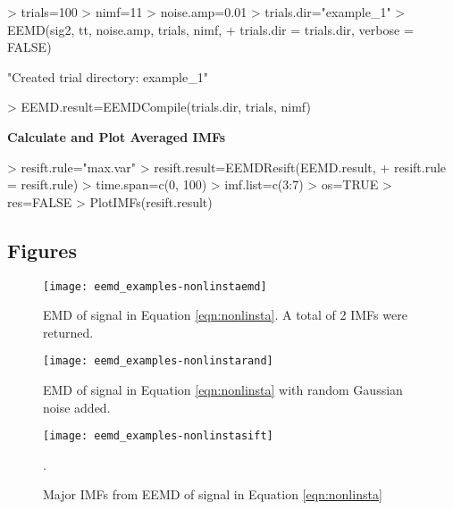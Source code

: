 \documentclass[12pt]{article}
\begin{document}
\begin{Schunk}
\begin{Sinput}
> trials=100
> nimf=11
> noise.amp=0.01
> trials.dir="example_1"
> EEMD(sig2, tt, noise.amp, trials, nimf, 
+     trials.dir = trials.dir, verbose = FALSE)
\end{Sinput}
\begin{Soutput}
[1] "Created trial directory: example_1"
\end{Soutput}
\begin{Sinput}
> EEMD.result=EEMDCompile(trials.dir, trials, nimf)
\end{Sinput}
\end{Schunk}

\textbf{Calculate and Plot Averaged IMFs}

\begin{Schunk}
\begin{Sinput}
> resift.rule="max.var"
> resift.result=EEMDResift(EEMD.result, 
+ resift.rule = resift.rule)
> time.span=c(0, 100)
> imf.list=c(3:7)
> os=TRUE
> res=FALSE
> PlotIMFs(resift.result)
\end{Sinput}
\end{Schunk}

\subsection{Figures}

\FloatBarrier

\begin{figure}[ht]
\begin{center}
\texttt{[image: eemd\_examples-nonlinstaemd]}
\end{center}
\caption{EMD of signal in Equation \ref{eqn:nonlinsta}.
A total of 2 IMFs were returned.}
\label{fig:nonlinstaemd}
\end{figure}

\begin{figure}[ht]
\begin{center}
\texttt{[image: eemd\_examples-nonlinstarand]}
\end{center}
\caption{EMD of signal in Equation \ref{eqn:nonlinsta} with random Gaussian noise added.}
\label{fig:nonlinstarand}
\end{figure}

\begin{figure}[ht]
\begin{center}
\texttt{[image: eemd\_examples-nonlinstasift]}
\end{center}
\caption{Major IMFs from EEMD of signal in Equation \ref{eqn:nonlinsta}}.
\label{fig:nonlinstasift}
\end{figure}
\end{document}
